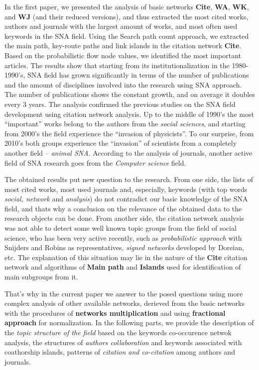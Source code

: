 \documentclass[11pt]{article} %
\begin{document}
In the first paper, we presented the analysis of basic networks \textbf{Cite}, \textbf{WA}, \textbf{WK}, and \textbf{WJ} (and their reduced versions), and thus extracted the  most cited works, authors and journals with the largest amount of works, and most often used keywords in the SNA field. Using the Search path count approach, we extracted the main path, key-route paths and link islands in the citation network \textbf{Cite}. Based on the probabilistic flow node values, we identified the most important articles. The results show that starting from its institutionalization in the 1980-1990's, SNA field has grown significantly in terms of the number of publications and the amount of disciplines involved into the research using SNA approach. The number of publications shows the constant growth, and on average it doubles every 3 years. The analysis confirmed the previous studies on the SNA field development using citation network analysis. Up to the middle of 1990's the most ``important'' works belong to the authors from the \textit{social sciences}, and starting from 2000's the field experience the ``invasion of physicists''. To our surprise, from 2010's both groups experience the ``invasion'' of scientists from a completely another field -- \textit{animal SNA}. According to the analysis of journals, another active field of SNA research goes from the \textit{Computer science} field.  \medskip 

The obtained results put new question to the research. From one side, the lists of most cited works, most used journals and, especially, keywords (with top words \textit{social, network} and \textit{analysis}) do not contradict our basic knowledge of the SNA field, and thats why a conclusion on the relevance of the obtained data to the research objects can be done. From another side, the citation network analysis was not able to detect some well known topic groups from the field of social science, who has been very active recently, such as \textit{probabilistic approach} with Snijders and Robins as representatives, \textit{signed networks} developed by Doreian, etc. The explanation of this situation may lie in the nature of the \textbf{Cite} citation network and algorithms of \textbf{Main path} and \textbf{Islands} used for identification of main subgroups from it.\medskip 

That's why in the current paper we answer to the posed questions using more complex analysis of other available networks, derieved from the basic networks with the procedures of \textbf{networks multiplication} and using \textbf{fractional approach} for normalization. In the following parts, we provide the description of the \textit{topic structure of the field} based on the keywords co-occurence netwok analysis, the structures of \textit{authors collaboration} and keywords associated with coathorship islands, patterns of \textit{citation and co-citation} among authors and journals.\medskip 
\end{document}
